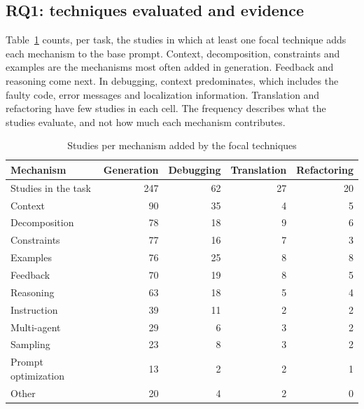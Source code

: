 \subsection{RQ1: techniques evaluated and evidence}\label{sec:qp1}
Table~\ref{tab:mecanismos} counts, per task, the studies in which at least one focal technique adds each
mechanism to the base prompt. Context, decomposition, constraints and examples are the mechanisms most often added in generation. Feedback and reasoning come next. In debugging, context predominates, which includes
the faulty code, error messages and localization information. Translation and refactoring have few studies in
each cell. The frequency describes what the studies evaluate, and not how much each mechanism contributes.

\begin{table}[!t]
\caption{Studies per mechanism added by the focal techniques}\label{tab:mecanismos}
\centering\footnotesize
\setlength{\tabcolsep}{4pt}
\begin{tabular}{@{}lrrrr@{}}
\hline
Mechanism & Generation & Debugging & Translation & Refactoring\\
\hline
Studies in the task & 247 & 62 & 27 & 20\\
\hline
Context & 90 & 35 & 4 & 5\\
Decomposition & 78 & 18 & 9 & 6\\
Constraints & 77 & 16 & 7 & 3\\
Examples & 76 & 25 & 8 & 8\\
Feedback & 70 & 19 & 8 & 5\\
Reasoning & 63 & 18 & 5 & 4\\
Instruction & 39 & 11 & 2 & 2\\
Multi-agent & 29 & 6 & 3 & 2\\
Sampling & 23 & 8 & 3 & 2\\
Prompt optimization & 13 & 2 & 2 & 1\\
Other & 20 & 4 & 2 & 0\\
\hline
\end{tabular}
\end{table}

